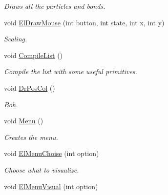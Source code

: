 \begin{DoxyCompactItemize}
\begin{DoxyCompactList}\small\item\em \-Draws all the particles and bonds. \end{DoxyCompactList}\item 
\hypertarget{classElPoly_a3e0a298765b939458531a9590e84c275}{void \hyperlink{classElPoly_a3e0a298765b939458531a9590e84c275}{\-El\-Draw\-Mouse} (int button, int state, int x, int y)}\label{classElPoly_a3e0a298765b939458531a9590e84c275}

\begin{DoxyCompactList}\small\item\em \-Scaling. \end{DoxyCompactList}\item 
\hypertarget{classElPoly_aae73eb2f2ced8322a9ce2aeb361cd483}{void \hyperlink{classElPoly_aae73eb2f2ced8322a9ce2aeb361cd483}{\-Compile\-List} ()}\label{classElPoly_aae73eb2f2ced8322a9ce2aeb361cd483}

\begin{DoxyCompactList}\small\item\em \-Compile the list with some useful primitives. \end{DoxyCompactList}\item 
\hypertarget{classElPoly_a6793bf2cb18afd12d89c95d402a80ca9}{void \hyperlink{classElPoly_a6793bf2cb18afd12d89c95d402a80ca9}{\-Dr\-Pos\-Col} ()}\label{classElPoly_a6793bf2cb18afd12d89c95d402a80ca9}

\begin{DoxyCompactList}\small\item\em \-Boh. \end{DoxyCompactList}\item 
\hypertarget{classElPoly_afdf1ca9e7afc3e7ec41b47fea4b3d80d}{void \hyperlink{classElPoly_afdf1ca9e7afc3e7ec41b47fea4b3d80d}{\-Menu} ()}\label{classElPoly_afdf1ca9e7afc3e7ec41b47fea4b3d80d}

\begin{DoxyCompactList}\small\item\em \-Creates the menu. \end{DoxyCompactList}\item 
\hypertarget{classElPoly_a5c117667fbf63957d9f36808b5b4c942}{void \hyperlink{classElPoly_a5c117667fbf63957d9f36808b5b4c942}{\-El\-Menu\-Choise} (int option)}\label{classElPoly_a5c117667fbf63957d9f36808b5b4c942}

\begin{DoxyCompactList}\small\item\em \-Choose what to visualize. \end{DoxyCompactList}\item 
\hypertarget{classElPoly_af63d4f8105b2cc36e7de437e9321f8f9}{void \hyperlink{classElPoly_af63d4f8105b2cc36e7de437e9321f8f9}{\-El\-Menu\-Visual} (int option)}\label{classElPoly_af63d4f8105b2cc36e7de437e9321f8f9}


\end{DoxyCompactItemize}
